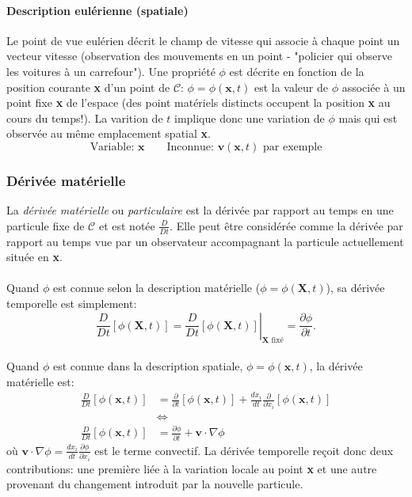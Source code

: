  \paragraph{Description eulérienne (spatiale)}
Le point de vue eulérien décrit le champ de vitesse qui associe à chaque point un vecteur vitesse (observation des mouvements en un point - "policier qui observe les voitures à un carrefour"). Une propriété $\phi$ est décrite en fonction de la position courante \textbf{x} d'un point de $\mathcal{C}$: $\phi=\phi(\textbf{x},t)$ est la valeur de $\phi$ associée à un point fixe \textbf{x} de l'espace (des point matériels distincts occupent la position \textbf{x} au cours du temps!). La varition de $t$ implique donc une variation de $\phi$ mais qui est observée au même emplacement spatial \textbf{x}. 
$$\text{Variable: }\textbf{x}\qquad\text{Inconnue: }\textbf{v}(\textbf{x},t)\text{ par exemple}$$

\subsubsection*{Dérivée matérielle}
La \emph{dérivée matérielle} ou \emph{particulaire} est la dérivée par rapport au temps en une particule fixe de $\mathcal{C}$ et est notée $\frac{D}{Dt}$. Elle peut être considérée comme la dérivée par rapport au temps vue par un observateur accompagnant la particule actuellement située en \textbf{x}.
\paragraph{}
 Quand $\phi$ est connue selon la description matérielle ($\phi=\phi(\textbf{X},t)$), sa dérivée temporelle est simplement: $$\frac{D}{Dt}[\phi(\textbf{X},t)]=\left.\frac{D}{Dt}[\phi(\textbf{X},t)]\right|_{\textbf{X}\text{ fixé}}=\frac{\partial \phi}{\partial t}.$$

\paragraph{}
Quand $\phi$ est connue dans la description spatiale, $\phi=\phi(\textbf{x},t)$, la dérivée matérielle est:
$$\begin{aligned}
\frac{D}{Dt}[\phi(\textbf{x},t)]&=\frac{\partial}{\partial t}[\phi(\textbf{x},t)]+\frac{dx_i}{dt}\frac{\partial}{\partial x_i}[\phi(\textbf{x},t)]\\
 &\Leftrightarrow\\
 \frac{D}{Dt}[\phi(\textbf{x},t)]&=\frac{\partial \phi}{\partial t} + \textbf{v}\cdot\nabla\phi 
\end{aligned}$$
où $\textbf{v}\cdot\nabla\phi=\frac{dx_i}{dt}\frac{\partial \phi}{\partial x_i}$ est le terme convectif. La dérivée temporelle reçoit donc deux contributions: une première liée à la variation locale au point \textbf{x} et une autre provenant du changement introduit par la nouvelle particule.
